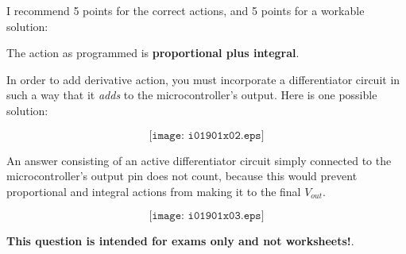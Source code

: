 
I recommend 5 points for the correct actions, and 5 points for a workable solution:

\vskip 10pt

The action as programmed is {\bf proportional plus integral}.  

\vskip 10pt

In order to add derivative action, you must incorporate a differentiator circuit in such a way that it {\it adds} to the microcontroller's output.  Here is one possible solution:

$$\texttt{[image: i01901x02.eps]}$$

An answer consisting of an active differentiator circuit simply connected to the microcontroller's output pin does not count, because this would prevent proportional and integral actions from making it to the final $V_{out}$.

$$\texttt{[image: i01901x03.eps]}$$







{\bf This question is intended for exams only and not worksheets!}.



